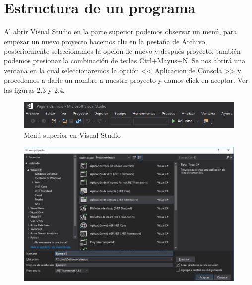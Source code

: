 \documentclass[12pt,a4paper]{report}
\begin{document}
\section{Estructura de un programa}
Al abrir Visual Studio en la parte superior podemos observar un menú, para empezar un nuevo proyecto hacemos clic en la pestaña de Archivo, posteriormente seleccionamos la opción de nuevo y después proyecto, también podemos presionar la combinación de teclas Ctrl+Mayus+N. Se nos abrirá una ventana en la cual seleccionaremos la opción << Aplicacion de Consola >> y procedemos a darle un nombre a nuestro proyecto y damos click en aceptar. Ver las figuras 2.3 y 2.4.\\
\begin{figure}[hbtp]
\centering
\includegraphics[width=16cm]{Csh_Imagenes/Menu_sup.PNG}
\caption{Menú superior en Visual Studio}
\end{figure}
\begin{figure}[hbtp]
\centering
\includegraphics[width=16cm]{Csh_Imagenes/ConsoleApp.PNG}
\caption{}
\end{figure}
\end{document}
